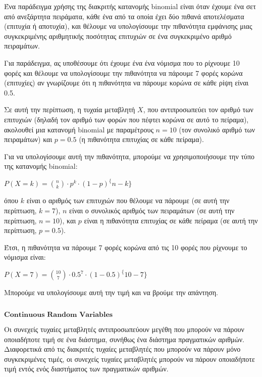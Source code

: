 \documentclass[11pt]{article}
\makeatletter
\newcommand{\boxspacing}{\kern\kvtcb@left@rule\kern\kvtcb@boxsep}
\newcommand{\prompt}[4]{
        {\ttfamily\llap{{\color{#2}[#3]:\hspace{3pt}#4}}\vspace{-\baselineskip}}
    }
\makeatother
\begin{document}
    Ένα παράδειγμα χρήσης της διακριτής κατανομής binomial είναι όταν έχουμε
ένα σετ από ανεξάρτητα πειράματα, κάθε ένα από τα οποία έχει δύο πιθανά
αποτελέσματα (επιτυχία ή αποτυχία), και θέλουμε να υπολογίσουμε την
πιθανότητα εμφάνισης μιας συγκεκριμένης αριθμητικής ποσότητας επιτυχιών
σε ένα συγκεκριμένο αριθμό πειραμάτων.

Για παράδειγμα, ας υποθέσουμε ότι έχουμε ένα ένα νόμισμα που το ρίχνουμε
10 φορές και θέλουμε να υπολογίσουμε την πιθανότητα να πάρουμε 7 φορές
κορώνα (επιτυχίες) αν γνωρίζουμε ότι η πιθανότητα να πάρουμε κορώνα σε
κάθε ρίψη είναι 0.5.

Σε αυτή την περίπτωση, η τυχαία μεταβλητή $ X $, που αντιπροσωπεύει
τον αριθμό των επιτυχιών (δηλαδή τον αριθμό των φορών που πέφτει κορώνα
σε αυτό το πείραμα), ακολουθεί μια κατανομή binomial με παραμέτρους $ n
= 10 $ (τον συνολικό αριθμό των πειραμάτων) και $ p = 0.5 $ (η
πιθανότητα επιτυχίας σε κάθε πείραμα).

Για να υπολογίσουμε αυτή την πιθανότητα, μπορούμε να χρησιμοποιήσουμε
την τύπο της κατανομής binomial:

$ P(X = k) = \binom{n}{k} \cdot p^k \cdot (1-p)^\{n-k\} $

όπου $ k $ είναι ο αριθμός των επιτυχιών που θέλουμε να πάρουμε (σε
αυτή την περίπτωση, $ k = 7 $), $ n $ είναι ο συνολικός αριθμός των
πειραμάτων (σε αυτή την περίπτωση, $ n = 10 $), και $ p $ είναι η
πιθανότητα επιτυχίας σε κάθε πείραμα (σε αυτή την περίπτωση, $ p = 0.5
$).

Έτσι, η πιθανότητα να πάρουμε 7 φορές κορώνα από τις 10 φορές που
ρίχνουμε το νόμισμα είναι:

$ P(X = 7) = \binom{10}{7} \cdot 0.5^7 \cdot (1-0.5)^\{10-7\} $

Μπορούμε να υπολογίσουμε αυτή την τιμή και να βρούμε την απάντηση.

    \begin{tcolorbox}[breakable, size=fbox, boxrule=1pt, pad at break*=1mm,colback=cellbackground, colframe=cellborder]
\prompt{In}{incolor}{ }{\boxspacing}
\begin{Verbatim}[commandchars=\\\{\}]

\end{Verbatim}
\end{tcolorbox}

    \(\textbf{Continuous Random Variables }\)

    Οι συνεχείς τυχαίες μεταβλητές αντιπροσωπεύουν μεγέθη που μπορούν να
πάρουν οποιαδήποτε τιμή σε ένα διάστημα, συνήθως ένα διάστημα
πραγματικών αριθμών. Διαφορετικά από τις διακριτές τυχαίες μεταβλητές
που μπορούν να πάρουν μόνο συγκεκριμένες τιμές, οι συνεχείς τυχαίες
μεταβλητές μπορούν να πάρουν οποιαδήποτε τιμή εντός ενός διαστήματος των
πραγματικών αριθμών.
\end{document}
